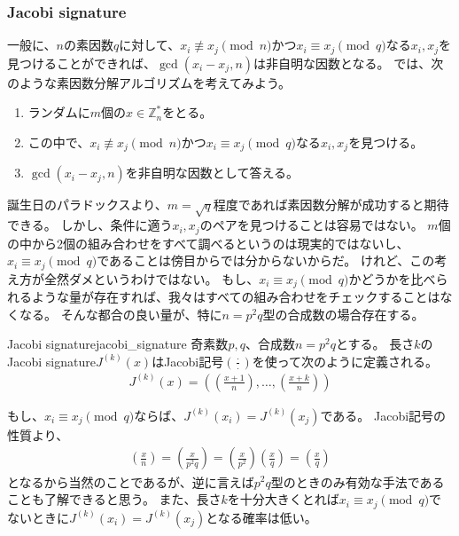 \subsubsection{Jacobi signature}
一般に、$n$の素因数$q$に対して、$x_i \not\equiv x_j \pmod{n}$かつ$x_i \equiv x_j \pmod{q}$なる$x_i,x_j$を見つけることができれば、$\gcd(x_i-x_j, n)$は非自明な因数となる。
では、次のような素因数分解アルゴリズムを考えてみよう。

\begin{enumerate}
 \item ランダムに$m$個の$x\in\mathbb{Z}_n^*$をとる。
 \item この中で、$x_i \not\equiv x_j \pmod{n}$かつ$x_i \equiv x_j \pmod{q}$なる$x_i,x_j$を見つける。
 \item $\gcd(x_i-x_j, n)$を非自明な因数として答える。
\end{enumerate}

誕生日のパラドックスより、$m=\sqrt{q}$程度であれば素因数分解が成功すると期待できる。
しかし、条件に適う$x_i,x_j$のペアを見つけることは容易ではない。
$m$個の中から2個の組み合わせをすべて調べるというのは現実的ではないし、$x_i \equiv x_j \pmod{q}$であることは傍目からでは分からないからだ。
けれど、この考え方が全然ダメというわけではない。
もし、$x_i \equiv x_j \pmod{q}$かどうかを比べられるような量が存在すれば、我々はすべての組み合わせをチェックすることはなくなる。
そんな都合の良い量が、特に$n=p^2q$型の合成数の場合存在する。

\begin{Defi}{Jacobi signature\cite{PeraltaOkamoto1996}}{jacobi_signature}
奇素数$p,q$、合成数$n=p^2q$とする。
長さ$k$のJacobi signature$J^{(k)}(x)$はJacobi記号$\left(\frac{\cdot}{\cdot} \right)$を使って次のように定義される。
\begin{align*}
J^{(k)}(x) = \left( \left(\frac{x + 1}{n} \right), \ldots, \left(\frac{x + k}{n} \right) \right)
\end{align*}
\end{Defi}

もし、$x_i \equiv x_j \pmod{q}$ならば、$J^{(k)}(x_i)=J^{(k)}(x_j)$である。
Jacobi記号の性質より、
\begin{align*}
\left(\frac{x}{n} \right) = \left(\frac{x}{p^2q} \right) = \left(\frac{x}{p^2} \right)\left(\frac{x}{q} \right) = \left(\frac{x}{q} \right)
\end{align*}
となるから当然のことであるが、逆に言えば$p^2q$型のときのみ有効な手法であることも了解できると思う。
また、長さ$k$を十分大きくとれば$x_i \equiv x_j \pmod{q}$でないときに$J^{(k)}(x_i)=J^{(k)}(x_j)$となる確率は低い。

